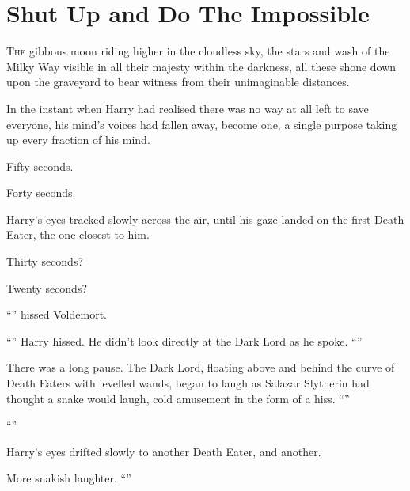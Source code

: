 \chapter{Shut Up and Do The Impossible}

\lettrine{T}{he} gibbous moon riding higher in the cloudless sky, the stars and wash of the Milky Way visible in all their majesty within the darkness, all these shone down upon the graveyard to bear witness from their unimaginable distances.

In the instant when Harry had realised there was no way at all left to save everyone, his mind’s voices had fallen away, become one, a single purpose taking up every fraction of his mind.

Fifty seconds.

Forty seconds.

Harry’s eyes tracked slowly across the air, until his gaze landed on the first Death Eater, the one closest to him.

Thirty seconds?

Twenty seconds?

“” hissed Voldemort.

“” Harry hissed. He didn’t look directly at the Dark Lord as he spoke. “”

There was a long pause. The Dark Lord, floating above and behind the curve of Death Eaters with levelled wands, began to laugh as Salazar Slytherin had thought a snake would laugh, cold amusement in the form of a hiss. “”

“”

Harry’s eyes drifted slowly to another Death Eater, and another.

More snakish laughter. “”

